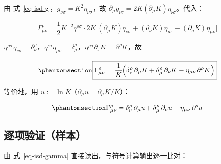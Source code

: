 \documentclass[
  chinese,
  a4paper,
  UTF8,
  12pt,
  oneside,
  openany]{ctexbook}
\theoremstyle{plain}
\theoremstyle{plain}
\theoremstyle{plain}
\theoremstyle{definition}
\theoremstyle{plain}
\theoremstyle{plain}
\theoremstyle{remark}
\begin{document}
由 式~\ref{eq-isd-g}，\(g_{\nu\sigma}=K^{2}\eta_{\nu\sigma}\)，故
\(\partial_\mu g_{\nu\sigma}=2K(\partial_{\mu}K)\eta_{\nu\sigma}\)。代入：

\[
\Gamma^{\rho}_{\mu\nu}=\frac{1}{2}K^{-2}\eta^{\rho\sigma}\cdot 2K
\bigl[(\partial_{\mu}K)\eta_{\nu\sigma}+(\partial_{\nu}K)\eta_{\mu\sigma}-(\partial_{\sigma}K)\eta_{\mu\nu}\bigr]
\]

\(\eta^{\rho\sigma}\eta_{\nu\sigma}=\delta^{\rho}_{\nu}\)，\(\eta^{\rho\sigma}\eta_{\mu\sigma}=\delta^{\rho}_{\mu}\)，\(\eta^{\rho\sigma}\partial_{\sigma}K=\partial^{\rho}K\)，故

\begin{equation}\protect\phantomsection\label{eq-isd-gamma}{
\boxed{\Gamma^{\rho}_{\mu\nu}=\frac{1}{K}
\Bigl(\delta^{\rho}_{\nu}\,\partial_{\mu}K+\delta^{\rho}_{\mu}\,\partial_{\nu}K-\eta_{\mu\nu}\,\partial^{\rho}K\Bigr)}
}\end{equation}

等价地，用 \(u:=\ln K\)（\(\partial_\mu u=\partial_{\mu}K/K\)）：

\begin{equation}\protect\phantomsection\label{eq-isd-gamma-u}{
\Gamma^{\rho}_{\mu\nu}=\delta^{\rho}_{\nu}\,\partial_\mu u+\delta^{\rho}_{\mu}\,\partial_\nu u-\eta_{\mu\nu}\,\partial^{\rho}u
}\end{equation}

\subsection{逐项验证（样本）}\label{ux9010ux9879ux9a8cux8bc1ux6837ux672c}

由 式~\ref{eq-isd-gamma} 直接读出，与符号计算输出逐一比对：
\end{document}
